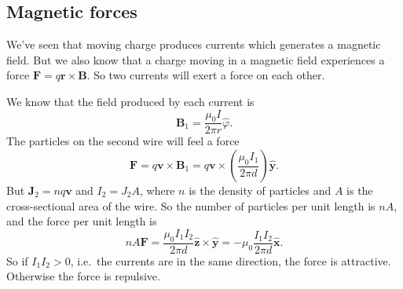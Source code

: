 \documentclass[a4paper]{article}
\begin{document}
\subsection{Magnetic forces}
We've seen that moving charge produces currents which generates a magnetic field. But we also know that a charge moving in a magnetic field experiences a force $\mathbf{F} = q\mathbf{r}\times \mathbf{B}$. So two currents will exert a force on each other.

\begin{eg}\leavevmode
  \begin{center}
  \end{center}
  We know that the field produced by each current is
  \[
    \mathbf{B}_1 = \frac{\mu_0 I}{2\pi r}\hat{\varphi}.
  \]
  The particles on the second wire will feel a force
  \[
    \mathbf{F} = q\mathbf{v}\times \mathbf{B}_1 = q\mathbf{v}\times \left(\frac{\mu_0 I_1}{2\pi d}\right) \hat{\mathbf{y}}.
  \]
  But $\mathbf{J}_2 = nq\mathbf{v}$ and $I_2 = J_2 A$, where $n$ is the density of particles and $A$ is the cross-sectional area of the wire. So the number of particles per unit length is $nA$, and the force per unit length is
  \[
    nA\mathbf{F} = \frac{\mu_0 I_1I_2}{2\pi d}\hat{\mathbf{z}}\times \hat{\mathbf{y}} = -\mu_0\frac{I_1I_2}{2\pi d}\hat{\mathbf{x}}.
  \]
  So if $I_1I_2 > 0$, i.e.\ the currents are in the same direction, the force is attractive. Otherwise the force is repulsive.
\end{eg}
\end{document}
